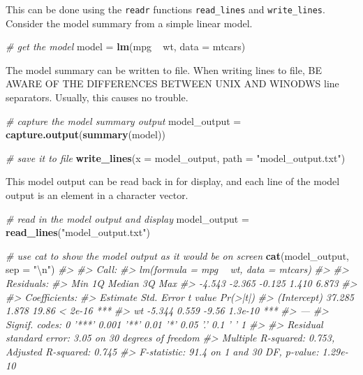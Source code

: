 \documentclass[]{book}
\newenvironment{Shaded}{}{}
\newcommand{\CharTok}[1]{\textcolor[rgb]{0.25,0.44,0.63}{#1}}
\newcommand{\CommentTok}[1]{\textcolor[rgb]{0.38,0.63,0.69}{\textit{#1}}}
\newcommand{\DataTypeTok}[1]{\textcolor[rgb]{0.56,0.13,0.00}{#1}}
\newcommand{\KeywordTok}[1]{\textcolor[rgb]{0.00,0.44,0.13}{\textbf{#1}}}
\newcommand{\NormalTok}[1]{#1}
\newcommand{\OperatorTok}[1]{\textcolor[rgb]{0.40,0.40,0.40}{#1}}
\newcommand{\StringTok}[1]{\textcolor[rgb]{0.25,0.44,0.63}{#1}}
\begin{document}
This can be done using the \texttt{readr} functions \texttt{read\_lines} and \texttt{write\_lines}. Consider the model summary from a simple linear model.

\begin{Shaded}
\begin{Highlighting}[]
\CommentTok{# get the model}
\NormalTok{model =}\StringTok{ }\KeywordTok{lm}\NormalTok{(mpg }\OperatorTok{~}\StringTok{ }\NormalTok{wt, }\DataTypeTok{data =}\NormalTok{ mtcars)}
\end{Highlighting}
\end{Shaded}

The model summary can be written to file. When writing lines to file, BE AWARE OF THE DIFFERENCES BETWEEN UNIX AND WINODWS line separators. Usually, this causes no trouble.

\begin{Shaded}
\begin{Highlighting}[]
\CommentTok{# capture the model summary output}
\NormalTok{model_output =}\StringTok{ }\KeywordTok{capture.output}\NormalTok{(}\KeywordTok{summary}\NormalTok{(model))}

\CommentTok{# save it to file}
\KeywordTok{write_lines}\NormalTok{(}\DataTypeTok{x =}\NormalTok{ model_output,}
  \DataTypeTok{path =} \StringTok{"model_output.txt"}\NormalTok{)}
\end{Highlighting}
\end{Shaded}

This model output can be read back in for display, and each line of the model output is an element in a character vector.

\begin{Shaded}
\begin{Highlighting}[]
\CommentTok{# read in the model output and display}
\NormalTok{model_output =}\StringTok{ }\KeywordTok{read_lines}\NormalTok{(}\StringTok{"model_output.txt"}\NormalTok{)}

\CommentTok{# use cat to show the model output as it would be on screen}
\KeywordTok{cat}\NormalTok{(model_output, }\DataTypeTok{sep =} \StringTok{"}\CharTok{\textbackslash{}n}\StringTok{"}\NormalTok{)}
\CommentTok{#> }
\CommentTok{#> Call:}
\CommentTok{#> lm(formula = mpg ~ wt, data = mtcars)}
\CommentTok{#> }
\CommentTok{#> Residuals:}
\CommentTok{#>    Min     1Q Median     3Q    Max }
\CommentTok{#> -4.543 -2.365 -0.125  1.410  6.873 }
\CommentTok{#> }
\CommentTok{#> Coefficients:}
\CommentTok{#>             Estimate Std. Error t value Pr(>|t|)    }
\CommentTok{#> (Intercept)   37.285      1.878   19.86  < 2e-16 ***}
\CommentTok{#> wt            -5.344      0.559   -9.56  1.3e-10 ***}
\CommentTok{#> ---}
\CommentTok{#> Signif. codes:  0 '***' 0.001 '**' 0.01 '*' 0.05 '.' 0.1 ' ' 1}
\CommentTok{#> }
\CommentTok{#> Residual standard error: 3.05 on 30 degrees of freedom}
\CommentTok{#> Multiple R-squared:  0.753,  Adjusted R-squared:  0.745 }
\CommentTok{#> F-statistic: 91.4 on 1 and 30 DF,  p-value: 1.29e-10}
\end{Highlighting}
\end{Shaded}
\end{document}
